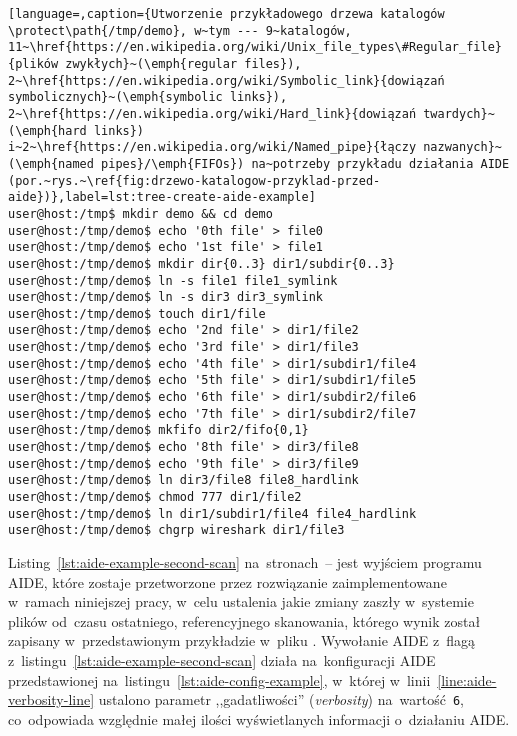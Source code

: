 \documentclass[thesis]{subfiles}
\begin{document}
\begin{appendices}
\begin{minipage}{\linewidth}
\begin{lstlisting}[language=,caption={Utworzenie przykładowego drzewa katalogów \protect\path{/tmp/demo}, w~tym --- 9~katalogów, 11~\href{https://en.wikipedia.org/wiki/Unix_file_types\#Regular_file}{plików zwykłych}~(\emph{regular files}), 2~\href{https://en.wikipedia.org/wiki/Symbolic_link}{dowiązań symbolicznych}~(\emph{symbolic links}), 2~\href{https://en.wikipedia.org/wiki/Hard_link}{dowiązań twardych}~(\emph{hard links}) i~2~\href{https://en.wikipedia.org/wiki/Named_pipe}{łączy nazwanych}~(\emph{named pipes}/\emph{FIFOs}) na~potrzeby przykładu działania AIDE (por.~rys.~\ref{fig:drzewo-katalogow-przyklad-przed-aide})},label=lst:tree-create-aide-example]
user@host:/tmp$ mkdir demo && cd demo
user@host:/tmp/demo$ echo '0th file' > file0
user@host:/tmp/demo$ echo '1st file' > file1
user@host:/tmp/demo$ mkdir dir{0..3} dir1/subdir{0..3}
user@host:/tmp/demo$ ln -s file1 file1_symlink
user@host:/tmp/demo$ ln -s dir3 dir3_symlink
user@host:/tmp/demo$ touch dir1/file
user@host:/tmp/demo$ echo '2nd file' > dir1/file2
user@host:/tmp/demo$ echo '3rd file' > dir1/file3
user@host:/tmp/demo$ echo '4th file' > dir1/subdir1/file4
user@host:/tmp/demo$ echo '5th file' > dir1/subdir1/file5
user@host:/tmp/demo$ echo '6th file' > dir1/subdir2/file6
user@host:/tmp/demo$ echo '7th file' > dir1/subdir2/file7
user@host:/tmp/demo$ mkfifo dir2/fifo{0,1}
user@host:/tmp/demo$ echo '8th file' > dir3/file8
user@host:/tmp/demo$ echo '9th file' > dir3/file9
user@host:/tmp/demo$ ln dir3/file8 file8_hardlink
user@host:/tmp/demo$ chmod 777 dir1/file2
user@host:/tmp/demo$ ln dir1/subdir1/file4 file4_hardlink
user@host:/tmp/demo$ chgrp wireshark dir1/file3
\end{lstlisting}
\end{minipage}

	Listing~\ref{lst:aide-example-second-scan} na~stronach~\pageref{lst:aide-example-second-scan}--\pageref{aide-example-second-scan-last-page} jest wyjściem programu AIDE, które zostaje przetworzone przez rozwiązanie zaimplementowane w~ramach niniejszej pracy, w~celu ustalenia jakie zmiany zaszły w~systemie plików od~czasu ostatniego, referencyjnego skanowania, którego wynik został zapisany w~przedstawionym przykładzie w~pliku . Wywołanie AIDE z~flagą  z~listingu~\ref{lst:aide-example-second-scan} działa na~konfiguracji AIDE  przedstawionej na~listingu~\ref{lst:aide-config-example}, w~której w~linii~\ref{line:aide-verbosity-line} ustalono parametr ,,gadatliwości'' (\emph{verbosity}) na~wartość~\texttt{6}, co~odpowiada względnie małej ilości wyświetlanych informacji o~działaniu AIDE.


\end{appendices}
\end{document}
